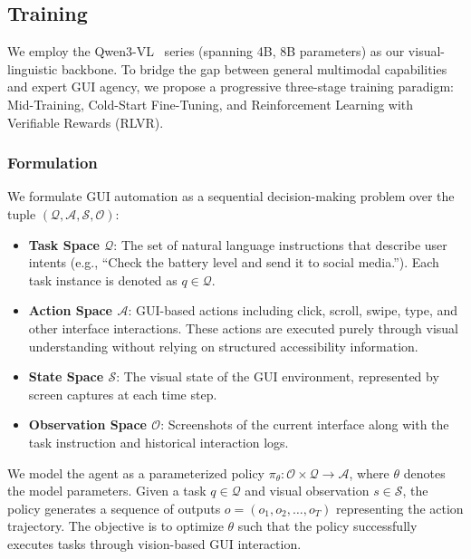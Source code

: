 \subsection{Training}
We employ the Qwen3-VL~\cite{Bai2025Qwen3VL} series (spanning 4B, 8B parameters) as our visual-linguistic backbone. 
To bridge the gap between general multimodal capabilities and expert GUI agency, we propose a progressive three-stage training paradigm: Mid-Training, Cold-Start Fine-Tuning, and Reinforcement Learning with Verifiable Rewards (RLVR).
\subsubsection{Formulation}
We formulate GUI automation as a sequential decision-making problem over the tuple $(\mathcal{Q}, \mathcal{A}, \mathcal{S}, \mathcal{O})$:

\begin{itemize}[leftmargin=*, itemsep=1pt]
    \item \textbf{Task Space $\mathcal{Q}$}: The set of natural language instructions that describe user intents (e.g., ``Check the battery level and send it to social media.''). Each task instance is denoted as $q \in \mathcal{Q}$.
    
    \item \textbf{Action Space $\mathcal{A}$}: GUI-based actions including click, scroll, swipe, type, and other interface interactions. These actions are executed purely through visual understanding without relying on structured accessibility information.
    
    \item \textbf{State Space $\mathcal{S}$}: The visual state of the GUI environment, represented by screen captures at each time step.
    
    \item \textbf{Observation Space $\mathcal{O}$}: Screenshots of the current interface along with the task instruction and historical interaction logs.
\end{itemize}

We model the agent as a parameterized policy $\pi_{\theta}: \mathcal{O} \times \mathcal{Q} \rightarrow \mathcal{A}$, where $\theta$ denotes the model parameters. Given a task $q \in \mathcal{Q}$ and visual observation $s \in \mathcal{S}$, the policy generates a sequence of outputs $o = (o_1, o_2, \ldots, o_T)$ representing the action trajectory. The objective is to optimize $\theta$ such that the policy successfully executes tasks through vision-based GUI interaction.


